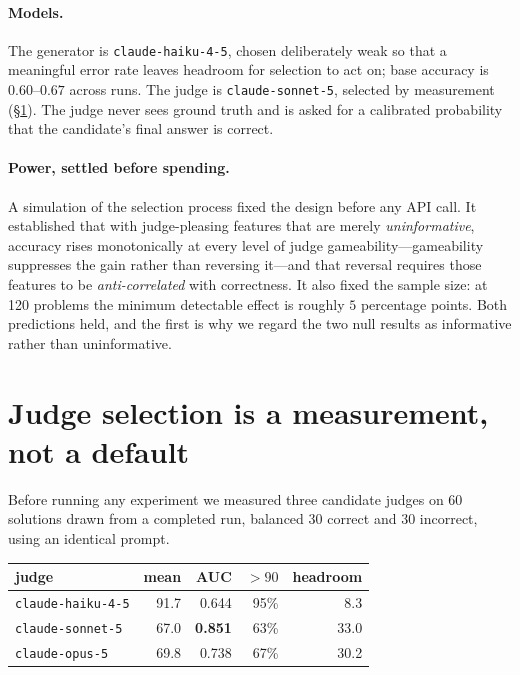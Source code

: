 \documentclass[10pt,twocolumn]{article}
\begin{document}
\paragraph{Models.} The generator is \texttt{claude-haiku-4-5}, chosen deliberately weak so that a meaningful error rate leaves headroom for selection to act on; base accuracy is $0.60$--$0.67$ across runs. The judge is \texttt{claude-sonnet-5}, selected by measurement (\S\ref{sec:judgesel}). The judge never sees ground truth and is asked for a calibrated probability that the candidate's final answer is correct.

\paragraph{Power, settled before spending.} A simulation of the selection process fixed the design before any API call. It established that with judge-pleasing features that are merely \emph{uninformative}, accuracy rises monotonically at every level of judge gameability---gameability suppresses the gain rather than reversing it---and that reversal requires those features to be \emph{anti-correlated} with correctness. It also fixed the sample size: at 120 problems the minimum detectable effect is roughly $5$ percentage points. Both predictions held, and the first is why we regard the two null results as informative rather than uninformative.

\section{Judge selection is a measurement, not a default}
\label{sec:judgesel}

Before running any experiment we measured three candidate judges on 60 solutions drawn from a completed run, balanced $30$ correct and $30$ incorrect, using an identical prompt.

\begin{center}
\small
\begin{tabular}{lrrrr}
\toprule
judge & mean & AUC & $>90$ & headroom \\
\midrule
\texttt{claude-haiku-4-5} & 91.7 & 0.644 & 95\% & 8.3 \\
\texttt{claude-sonnet-5}  & 67.0 & \textbf{0.851} & 63\% & 33.0 \\
\texttt{claude-opus-5}    & 69.8 & 0.738 & 67\% & 30.2 \\
\bottomrule
\end{tabular}
\end{center}
\end{document}
